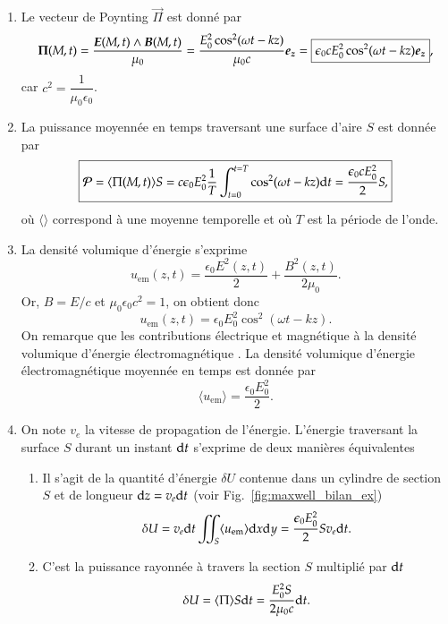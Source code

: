 \begin{corrige}
\begin{enumerate}
     \item Le vecteur de Poynting $\vec{\Pi}$ est donné par
	  \begin{equation*}
		  \vec{\Pi}(M, t) = \dfrac{\vece(M, t) \wedge \vecb(M, t)}{\mu_0}
		  = \dfrac{E_0^2 \cos^2(\omega t - k z)}{\mu_0 c} \ez
		  = \boxed{\epsilon_0 c E_0^2 \cos^2(\omega t - kz) \ez},
	  \end{equation*}
	  car $c^2 = \dfrac{1}{\mu_0 \epsilon_0}$.
     \item La puissance moyennée en temps traversant une surface d’aire $S$ est
	   donnée par
	   \begin{equation*}
		   \boxed{
			   \mathcal{P} = \langle \Pi(M,t) \rangle S = 
		   c \epsilon_0 E_0^2
		   \dfrac{1}{T} \int_{t = 0}^{t = T} \cos^2(\omega t - kz) \mathrm{d}t
		   = \dfrac{\epsilon_0 c E_0^2}{2}S,
	   }
	   \end{equation*}
	   où $\langle \rangle$ correspond à une moyenne temporelle et où $T$ 
	   est la période de l'onde.

     \item La densité volumique d'énergie s'exprime
	   \begin{equation*}
		   u_\mathrm{em}(z, t) = \dfrac{\epsilon_0 E^2(z, t)}{2} + 
		   \dfrac{B^2(z, t)}{2 \mu_0}.
	   \end{equation*}
	   Or, $B = E/c$ et $\mu_0 \epsilon_0 c^2 = 1$, on obtient donc
	   \begin{equation*}
		   \boxed{
			   u_\mathrm{em}(z, t) = \epsilon_0 E_0^2 \cos^2(\omega t - kz)
	   }.
   	\end{equation*}
	On remarque que les contributions électrique et magnétique à la densité 
	volumique d'énergie électromagnétique . La densité
	volumique d'énergie électromagnétique moyennée en temps est donnée par
	\begin{equation*}
		\boxed{
		\langle u_\mathrm{em} \rangle = \dfrac{\epsilon_0 E_0^2}{2}
		.}
	\end{equation*}
	\item On note $v_e$ la vitesse de propagation de l'énergie. L'énergie 
	      traversant la surface $S$ durant un instant $\mathrm{d}t$ s'exprime de deux
	      manières équivalentes
	      \begin{enumerate}
		      \item Il s'agit de la quantité d'énergie $\delta U$ contenue dans 
			    un cylindre de section $S$ et de longueur 
			    $\mathrm{d}z = v_e \mathrm{d}t$ (voir Fig.~\ref{fig:maxwell_bilan_ex})
			    \begin{equation*}
				    \delta U = v_e \mathrm{d}t \iint_S \langle
				    u_\mathrm{em} \rangle \mathrm{d}x \mathrm{d}y =
				    \dfrac{\epsilon_0 E_0^2}{2} S v_e \mathrm{d}t.
			   \end{equation*}
		     \item C'est la puissance rayonnée à travers la section $S$
			   multiplié par $\mathrm{d}t$
			   \begin{equation*}
				   \delta U = \langle \Pi \rangle S \mathrm{d}t = 
				   \dfrac{E_0^2 S}{2 \mu_0 c} \mathrm{d}t.
			  \end{equation*}


\end{enumerate}
\end{enumerate}
\end{corrige}
